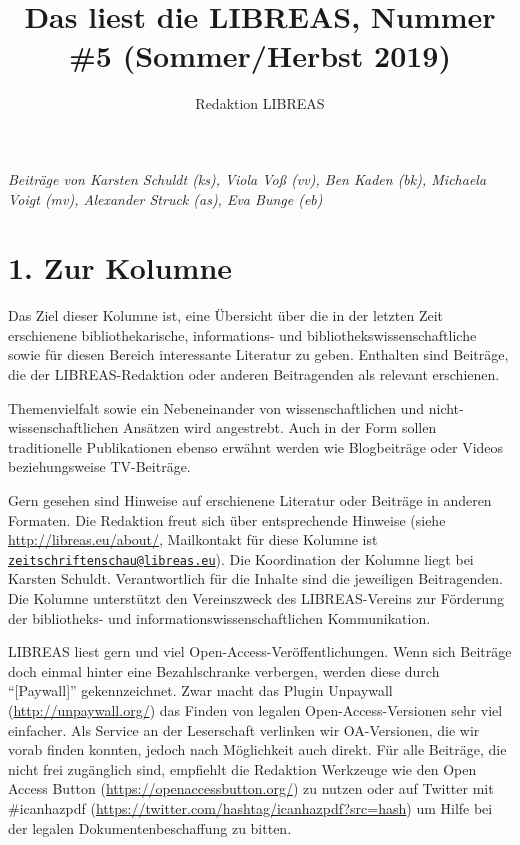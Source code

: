 \documentclass[a4paper,
fontsize=11pt,
oneside,
numbers=noperiodatend,
parskip=half-,
bibliography=totoc,
final
]{scrartcl}
\title{\LARGE{Das liest die LIBREAS, Nummer \#5 (Sommer/Herbst 2019)}} %
\author{Redaktion LIBREAS} %
\date{}
\begin{document}
\maketitle
\thispagestyle{fancyplain} 


\emph{Beiträge von Karsten Schuldt (ks), Viola Voß (vv), Ben Kaden (bk),
Michaela Voigt (mv), Alexander Struck (as), Eva Bunge (eb)}

\hypertarget{zur-kolumne}{%
\section{1. Zur Kolumne}\label{zur-kolumne}}

Das Ziel dieser Kolumne ist, eine Übersicht über die in der letzten Zeit
erschienene bibliothekarische, informations- und
bibliothekswissenschaftliche sowie für diesen Bereich interessante
Literatur zu geben. Enthalten sind Beiträge, die der LIBREAS-Redaktion
oder anderen Beitragenden als relevant erschienen.

Themenvielfalt sowie ein Nebeneinander von wissenschaftlichen und
nicht-wissenschaftlichen Ansätzen wird angestrebt. Auch in der Form
sollen traditionelle Publikationen ebenso erwähnt werden wie
Blogbeiträge oder Videos beziehungsweise TV-Beiträge.

Gern gesehen sind Hinweise auf erschienene Literatur oder Beiträge in
anderen Formaten. Die Redaktion freut sich über entsprechende Hinweise
(siehe \url{http://libreas.eu/about/}, Mailkontakt für diese Kolumne ist
\href{mailto:zeitschriftenschau@libreas.eu}{\nolinkurl{zeitschriftenschau@libreas.eu}}).
Die Koordination der Kolumne liegt bei Karsten Schuldt. Verantwortlich
für die Inhalte sind die jeweiligen Beitragenden. Die Kolumne
unterstützt den Vereinszweck des LIBREAS-Vereins zur Förderung der
bibliotheks- und informationswissenschaftlichen Kommunikation.

LIBREAS liest gern und viel Open-Access-Veröffentlichungen. Wenn sich
Beiträge doch einmal hinter eine Bezahlschranke verbergen, werden diese
durch \enquote{{[}Paywall{]}} gekennzeichnet. Zwar macht das Plugin
Unpaywall (\url{http://unpaywall.org/}) das Finden von legalen
Open-Access-Versionen sehr viel einfacher. Als Service an der
Leserschaft verlinken wir OA-Versionen, die wir vorab finden konnten,
jedoch nach Möglichkeit auch direkt. Für alle Beiträge, die nicht frei
zugänglich sind, empfiehlt die Redaktion Werkzeuge wie den Open Access
Button (\url{https://openaccessbutton.org/}) zu nutzen oder auf Twitter
mit \#icanhazpdf (\url{https://twitter.com/hashtag/icanhazpdf?src=hash})
um Hilfe bei der legalen Dokumentenbeschaffung zu bitten.
\end{document}
